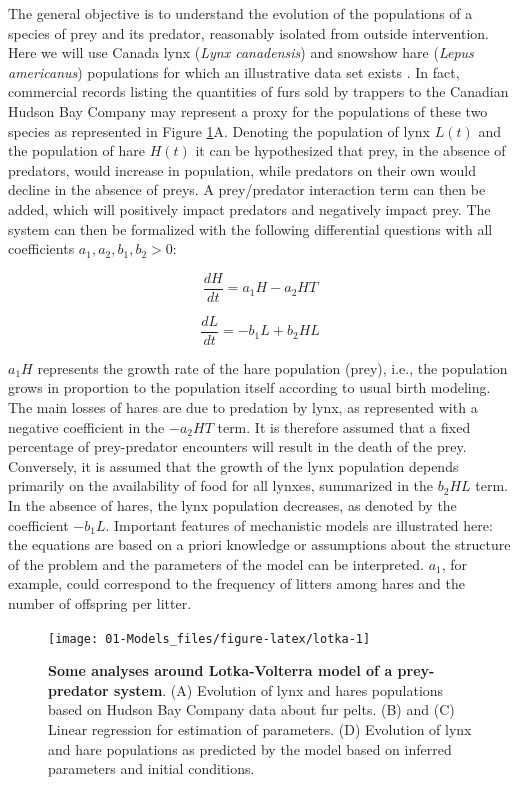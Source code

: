 \documentclass[a4paper,12pt,twoside,onecolumn,openright,final,oldfontcommands]{memoir}
\begin{document}
The general objective is to understand the evolution of the populations
of a species of prey and its predator, reasonably isolated from outside
intervention. Here we will use Canada lynx (\emph{Lynx canadensis}) and
snowshow hare (\emph{Lepus americanus}) populations for which an
illustrative data set exists \citep{hewitt1917conservation}. In fact,
commercial records listing the quantities of furs sold by trappers to
the Canadian Hudson Bay Company may represent a proxy for the
populations of these two species as represented in Figure
\ref{fig:lotka}A. Denoting the population of lynx \(L(t)\) and the
population of hare \(H(t)\) it can be hypothesized that prey, in the
absence of predators, would increase in population, while predators on
their own would decline in the absence of preys. A prey/predator
interaction term can then be added, which will positively impact
predators and negatively impact prey. The system can then be formalized
with the following differential questions with all coefficients
\(a_1, a_2, b_1, b_2 >0\):

\[\dfrac{dH}{dt}=a_1H-a_2HT\]

\[\dfrac{dL}{dt}=-b_1L+b_2HL\]

\(a_1H\) represents the growth rate of the hare population (prey), i.e.,
the population grows in proportion to the population itself according to
usual birth modeling. The main losses of hares are due to predation by
lynx, as represented with a negative coefficient in the \(-a_2HT\) term.
It is therefore assumed that a fixed percentage of prey-predator
encounters will result in the death of the prey. Conversely, it is
assumed that the growth of the lynx population depends primarily on the
availability of food for all lynxes, summarized in the \(b_2HL\) term.
In the absence of hares, the lynx population decreases, as denoted by
the coefficient \(-b_1L\). Important features of mechanistic models are
illustrated here: the equations are based on a priori knowledge or
assumptions about the structure of the problem and the parameters of the
model can be interpreted. \(a_1\), for example, could correspond to the
frequency of litters among hares and the number of offspring per litter.

\begin{figure}

{\centering \texttt{[image: 01-Models\_files/figure-latex/lotka-1]} 

}

\caption[Some analyses around Lotka-Volterra model of a prey-predator system]{\textbf{Some analyses around Lotka-Volterra model of
a prey-predator system}. (A) Evolution of lynx and hares populations
based on Hudson Bay Company data about fur pelts. (B) and (C) Linear
regression for estimation of parameters. (D) Evolution of lynx and hare
populations as predicted by the model based on inferred parameters and
initial conditions.}\label{fig:lotka}
\end{figure}
\end{document}
